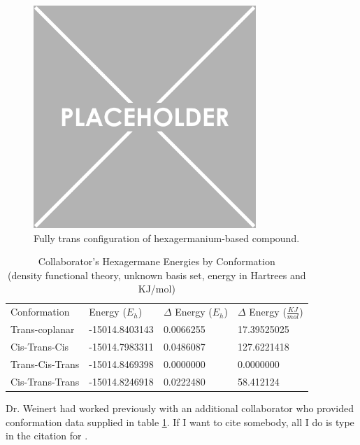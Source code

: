 \begin{figure}
	
	\centering
	
	\includegraphics[width=0.75\textwidth]{placeholder.png}
	
	\caption{Fully trans configuration of hexagermanium-based compound.}
	
	\label{fig:Ge6TransAll}
	
\end{figure}
\begin{table}[]
	
	\centering
	
	\begin{tabular}{llll}
		Conformation & Energy ($E_{h}$)    & $\Delta$ Energy ($E_{h}$) & $\Delta$ Energy ($\frac{KJ}{mol}$) \\ \cline{1-4} 
		Trans-coplanar        & -15014.8403143 & 0.0066255            & 17.39525025                        \\
		Cis-Trans-Cis         & -15014.7983311 & 0.0486087            & 127.6221418                        \\
		Trans-Cis-Trans       & -15014.8469398 & 0.0000000            & 0.0000000                                  \\
		Cis-Trans-Trans       & -15014.8246918 & 0.0222480            & 58.412124                         
	\end{tabular}
	
	\centering
	
	\caption{Collaborator's Hexagermane Energies by Conformation \\ (density functional theory, unknown basis set, energy in Hartrees and KJ/mol)}
	
	\label{tab:Ge6CollabEnergies}
	
\end{table}
Dr. Weinert had worked previously with an additional collaborator who provided conformation data supplied in table \ref{tab:Ge6CollabEnergies}.
If I want to cite somebody, all I do is type in the citation for \cite{BFIceOG}.


